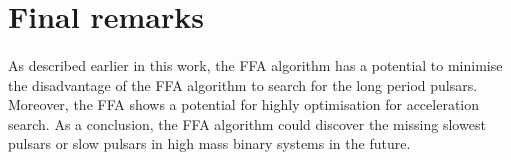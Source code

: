 \documentclass[../chapter1/thesis_msc.tex]{subfiles}
\begin{document}

\section{Final remarks}
\paragraph{} As described earlier in this work, the FFA algorithm has a potential to minimise the disadvantage of the FFA algorithm to search for the long period pulsars. Moreover, the FFA shows a potential for highly optimisation for acceleration search. As a conclusion, the FFA algorithm could discover the missing slowest pulsars or slow pulsars in high mass binary systems in the future.  
\end{document}
